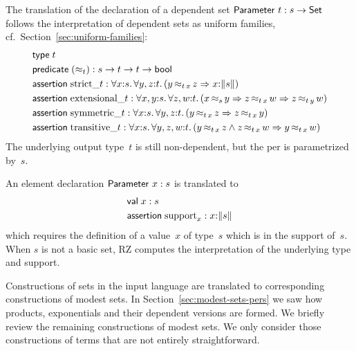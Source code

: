 The translation of the declaration of a dependent set
$\mathsf{Parameter}\ t : s \to \mathsf{Set}$ follows the interpretation of dependent
sets as uniform families, cf.\ Section~\ref{sec:uniform-families}:
%
\begin{align*}  
  & \otyspec{t} \\
  & \opropspec{({\approx_{t}})}{\oarrow{s}{\oarrow{t}{\oarrow{t}{\oProp}}}}\\
  & \oassertion{\mathrm{strict}\_{t}}{
    \oforall{x}{s}{
      \oforall{y,z}{t}{
        (\oimply{\oper{\oapp{t}{x}}{y}{z}}{\ototal{x}{s}})
      }
    }
  } \\
  & \oassertion{\mathrm{extensional}\_{t}}{
    \oforall{x,y}{s}{
      \oforall{z,w}{t}{
        (\oimply{\oper{s}{x}{y}}{
          \oimply{\oper{\oapp{t}{x}}{z}{w}}{\oper{\oapp{t}{y}}{z}{w}}
        })
      }
    }
  } \\
  & \oassertion{\mathrm{symmetric}\_{t}}{
    \oforall{x}{s}{
      \oforall{y,z}{t}{(\oimply{\oper{\oapp{t}{x}}{y}{z}}{\oper{\oapp{t}{x}}{z}{y}})}
    }
  }
  \\
  & \oassertion{\mathrm{transitive}\_{t}}{
    \oforall{x}{s}{
      \oforall{y,z,w}{t}{(
        \oimply{
          \oper{\oapp{t}{x}}{y}{z} \land \oper{\oapp{t}{x}}{z}{w}
        }{\oper{\oapp{t}{x}}{y}{w}}
        )}
    }
  }
\end{align*}
%
The underlying output type~$t$ is still non-dependent, but the per is
parametrized by~$s$.

An element declaration $\mathsf{Parameter}\ x : s$ is translated to
%
\begin{align*}
  & \mathsf{val}\;x:s \\
  & \mathsf{assertion}\; \mathrm{support}_x : x{:}\|s\|
\end{align*}
%
which requires the definition of a value~$x$ of type~$s$ which is in
the support of~$s$. When $s$ is not a basic set, RZ computes the
interpretation of the underlying type and support.

Constructions of sets in the input language are translated to
corresponding constructions of modest sets. In
Section~\ref{sec:modest-sets-pers} we saw how products, exponentials
and their dependent versions are formed. We briefly review the
remaining constructions of modest sets. We only consider those
constructions of terms that are not entirely straightforward.

